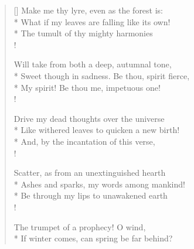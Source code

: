 \documentclass[MAIN]{subfiles}
\begin{document}
\settowidth{\versewidth}{Make me thy lyre, even as the forest is:}
\begin{verse}[\versewidth]
Make me thy lyre, even as the forest is:\\*
What if my leaves are falling like its own!\\*
The tumult of thy mighty harmonies\\!

Will take from both a deep, autumnal tone,\\*
Sweet though in sadness. Be thou, spirit fierce,\\*
My spirit! Be thou me, impetuous one!\\!

Drive my dead thoughts over the universe\\*
Like withered leaves to quicken a new birth!\\* 
And, by the incantation of this verse,\\!

Scatter, as from an unextinguished hearth\\* 
Ashes and sparks, my words among mankind!\\*
Be through my lips to unawakened earth\\!

The trumpet of a prophecy! O wind,\\*
If winter comes, can spring be far behind?
\end{verse}
\end{document}
